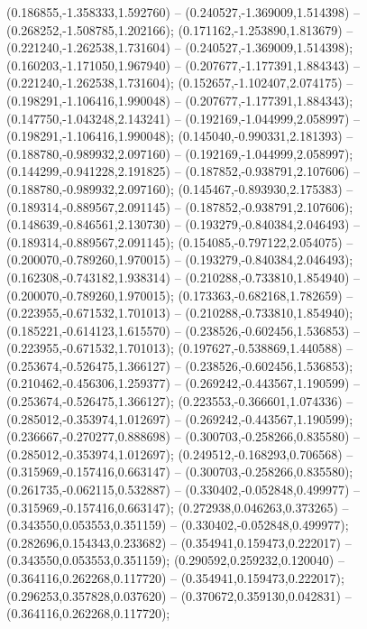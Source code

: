  (0.186855,-1.358333,1.592760) -- (0.240527,-1.369009,1.514398) -- (0.268252,-1.508785,1.202166);
 (0.171162,-1.253890,1.813679) -- (0.221240,-1.262538,1.731604) -- (0.240527,-1.369009,1.514398);
 (0.160203,-1.171050,1.967940) -- (0.207677,-1.177391,1.884343) -- (0.221240,-1.262538,1.731604);
 (0.152657,-1.102407,2.074175) -- (0.198291,-1.106416,1.990048) -- (0.207677,-1.177391,1.884343);
 (0.147750,-1.043248,2.143241) -- (0.192169,-1.044999,2.058997) -- (0.198291,-1.106416,1.990048);
 (0.145040,-0.990331,2.181393) -- (0.188780,-0.989932,2.097160) -- (0.192169,-1.044999,2.058997);
 (0.144299,-0.941228,2.191825) -- (0.187852,-0.938791,2.107606) -- (0.188780,-0.989932,2.097160);
 (0.145467,-0.893930,2.175383) -- (0.189314,-0.889567,2.091145) -- (0.187852,-0.938791,2.107606);
 (0.148639,-0.846561,2.130730) -- (0.193279,-0.840384,2.046493) -- (0.189314,-0.889567,2.091145);
 (0.154085,-0.797122,2.054075) -- (0.200070,-0.789260,1.970015) -- (0.193279,-0.840384,2.046493);
 (0.162308,-0.743182,1.938314) -- (0.210288,-0.733810,1.854940) -- (0.200070,-0.789260,1.970015);
 (0.173363,-0.682168,1.782659) -- (0.223955,-0.671532,1.701013) -- (0.210288,-0.733810,1.854940);
 (0.185221,-0.614123,1.615570) -- (0.238526,-0.602456,1.536853) -- (0.223955,-0.671532,1.701013);
 (0.197627,-0.538869,1.440588) -- (0.253674,-0.526475,1.366127) -- (0.238526,-0.602456,1.536853);
 (0.210462,-0.456306,1.259377) -- (0.269242,-0.443567,1.190599) -- (0.253674,-0.526475,1.366127);
 (0.223553,-0.366601,1.074336) -- (0.285012,-0.353974,1.012697) -- (0.269242,-0.443567,1.190599);
 (0.236667,-0.270277,0.888698) -- (0.300703,-0.258266,0.835580) -- (0.285012,-0.353974,1.012697);
 (0.249512,-0.168293,0.706568) -- (0.315969,-0.157416,0.663147) -- (0.300703,-0.258266,0.835580);
 (0.261735,-0.062115,0.532887) -- (0.330402,-0.052848,0.499977) -- (0.315969,-0.157416,0.663147);
 (0.272938,0.046263,0.373265) -- (0.343550,0.053553,0.351159) -- (0.330402,-0.052848,0.499977);
 (0.282696,0.154343,0.233682) -- (0.354941,0.159473,0.222017) -- (0.343550,0.053553,0.351159);
 (0.290592,0.259232,0.120040) -- (0.364116,0.262268,0.117720) -- (0.354941,0.159473,0.222017);
 (0.296253,0.357828,0.037620) -- (0.370672,0.359130,0.042831) -- (0.364116,0.262268,0.117720);
